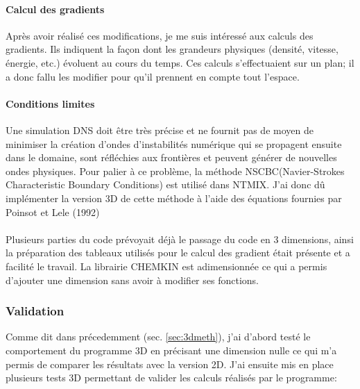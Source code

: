 \paragraph{Calcul des gradients}Après avoir réalisé ces modifications, je me suis intéressé aux calculs des gradients. Ils indiquent la façon dont les grandeurs physiques (densité, vitesse, énergie, etc.) évoluent au cours du temps. Ces calculs s'effectuaient sur un plan; il a donc fallu les modifier pour qu'il prennent en compte tout l'espace.

\paragraph{Conditions limites}Une simulation DNS doit être très précise et ne fournit pas de moyen de minimiser la création d'ondes d'instabilités numérique qui se propagent ensuite dans le domaine, sont réfléchies aux frontières et peuvent générer de nouvelles ondes physiques\cite{baritaud1996direct}. Pour palier à ce problème, la méthode NSCBC(Navier-Strokes Characteristic Boundary Conditions) est utilisé dans NTMIX. J'ai donc dû implémenter la version 3D de cette méthode à l'aide des équations fournies par Poinsot et Lele (1992)\cite{POINSOT1992104}

\paragraph{}Plusieurs parties du code prévoyait déjà le passage du code en 3 dimensions, ainsi la préparation des tableaux utilisés pour le calcul des gradient était présente et a facilité le travail. La librairie CHEMKIN est adimensionnée ce qui a permis d'ajouter une dimension sans avoir à modifier ses fonctions.


\subsubsection{Validation}
Comme dit dans précedemment (sec. \ref{sec:3dmeth}), j'ai d'abord testé le comportement du programme 3D en précisant une dimension nulle ce qui m'a permis de comparer les résultats avec la version 2D. J'ai ensuite mis en place plusieurs tests 3D permettant de valider les calculs réalisés par le programme:

